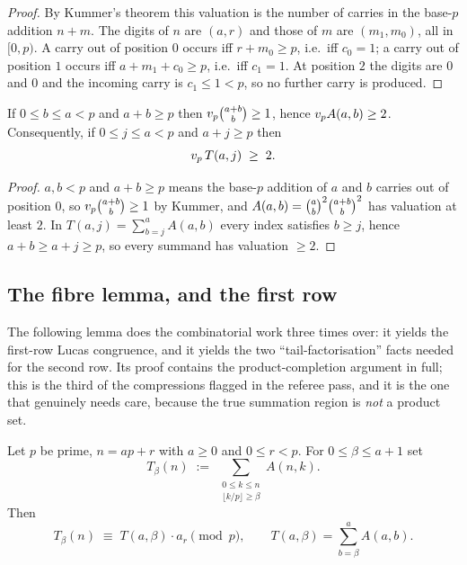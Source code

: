 \begin{proof}
By Kummer's theorem this valuation is the number of carries in the base-$p$ addition
$n+m$. The digits of $n$ are $(a,r)$ and those of $m$ are $(m_1,m_0)$, all in $[0,p)$. A
carry out of position $0$ occurs iff $r+m_0\ge p$, i.e.\ iff $c_0=1$; a carry out of
position $1$ occurs iff $a+m_1+c_0\ge p$, i.e.\ iff $c_1=1$. At position $2$ the digits
are $0$ and $0$ and the incoming carry is $c_1\le1<p$, so no further carry is produced.
\end{proof}

\begin{lemma}\label{lem:levelcarry}
If $0\le b\le a<p$ and $a+b\ge p$ then $v_p\binom{a+b}{b}\ge1$, hence $v_p A(a,b)\ge2$.
Consequently, if $0\le j\le a<p$ and $a+j\ge p$ then
\[
   v_p\,T(a,j)\;\ge\;2 .
\]
\end{lemma}

\begin{proof}
$a,b<p$ and $a+b\ge p$ means the base-$p$ addition of $a$ and $b$ carries out of position
$0$, so $v_p\binom{a+b}{b}\ge1$ by Kummer, and $A(a,b)=\binom{a}{b}^2\binom{a+b}{b}^2$ has valuation at
least $2$. In $T(a,j)=\sum_{b=j}^{a}A(a,b)$ every index satisfies $b\ge j$, hence
$a+b\ge a+j\ge p$, so every summand has valuation $\ge2$.
\end{proof}

\subsection{The fibre lemma, and the first row}

The following lemma does the combinatorial work three times over: it yields the first-row
Lucas congruence, and it yields the two ``tail-factorisation'' facts needed for the second
row. Its proof contains the product-completion argument in full; this is the third of the
compressions flagged in the referee pass, and it is the one that genuinely needs care,
because the true summation region is \emph{not} a product set.

\begin{lemma}\label{lem:fibre}
Let $p$ be prime, $n=ap+r$ with $a\ge0$ and $0\le r<p$. For $0\le\beta\le a+1$ set
\[
   T_\beta(n)\;:=\;\sum_{\substack{0\le k\le n\\ \lfloor k/p\rfloor\ge\beta}}A(n,k).
\]
Then
\[
   T_\beta(n)\;\equiv\;T(a,\beta)\cdot a_r\pmod p ,
   \qquad T(a,\beta)=\sum_{b=\beta}^{a}A(a,b).
\]
\end{lemma}

